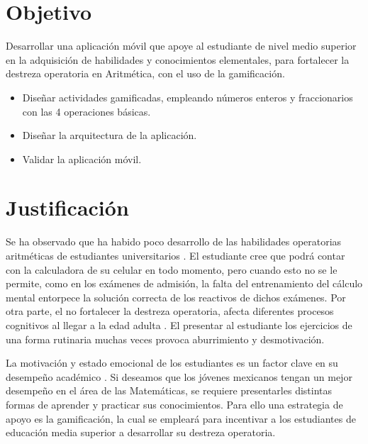 \documentclass{article}
\begin{document}
\section{Objetivo}

Desarrollar una aplicación móvil que apoye al estudiante de nivel medio superior en la 
adquisición de habilidades y conocimientos elementales, para fortalecer la destreza 
operatoria en  Aritmética, con el uso de la gamificación.

\begin{itemize}
	\item Diseñar actividades gamificadas, empleando números enteros y fraccionarios con las 4 operaciones básicas.
	\item Diseñar la arquitectura de la aplicación.
	\item Validar la aplicación móvil. 
\end{itemize}

\section{Justificación}

Se ha observado que ha habido poco desarrollo de las habilidades operatorias aritméticas de estudiantes 
universitarios \cite{tariq2002decline,carpenter2017psychology}. 
El estudiante cree que podrá contar con la calculadora de su celular en todo momento, 
pero cuando esto no se le permite, como en los exámenes de admisión, la falta del 
entrenamiento del cálculo mental entorpece la solución correcta de los reactivos 
de dichos exámenes. Por otra parte, el no fortalecer la destreza operatoria, afecta 
diferentes procesos cognitivos al llegar a la edad adulta \cite{martin2003loss}.
El presentar al estudiante los ejercicios de una forma rutinaria muchas veces provoca 
aburrimiento y desmotivación. 


La motivación y estado emocional de los estudiantes es un factor clave en su desempeño 
académico \cite{larrazolo2013habilidades,ryan1997should}. Si deseamos que los jóvenes 
mexicanos tengan un mejor desempeño en el área de las Matemáticas, se requiere presentarles 
distintas formas de aprender y practicar sus conocimientos. Para ello una estrategia de 
apoyo es la gamificación, la cual se empleará para incentivar a los estudiantes de educación 
media superior a desarrollar su destreza operatoria.
\end{document}
